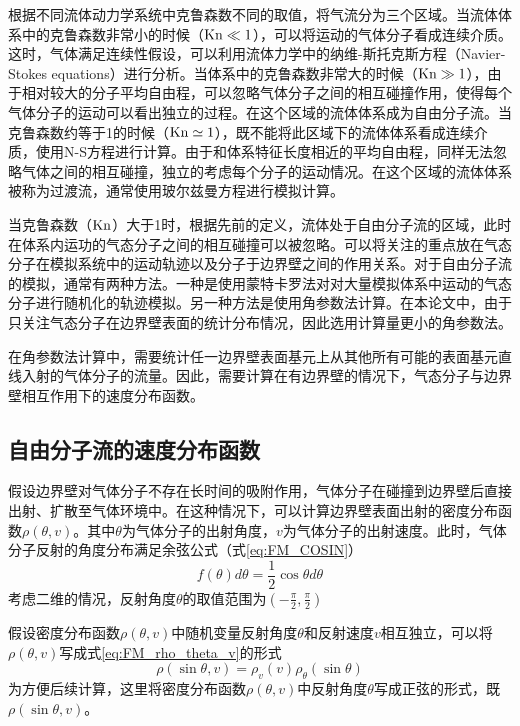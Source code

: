     根据不同流体动力学系统中克鲁森数不同的取值，将气流分为三个区域。当流体体系中的克鲁森数非常小的时候（${\rm Kn}\ll 1$），可以将运动的气体分子看成连续介质。这时，气体满足连续性假设，可以利用流体力学中的纳维-斯托克斯方程（Navier-Stokes equations）进行分析。当体系中的克鲁森数非常大的时候（${\rm Kn}\gg 1$），由于相对较大的分子平均自由程，可以忽略气体分子之间的相互碰撞作用，使得每个气体分子的运动可以看出独立的过程。在这个区域的流体体系成为自由分子流。当克鲁森数约等于1的时候（${\rm Kn}\simeq 1$），既不能将此区域下的流体体系看成连续介质，使用N-S方程进行计算。由于和体系特征长度相近的平均自由程，同样无法忽略气体之间的相互碰撞，独立的考虑每个分子的运动情况。在这个区域的流体体系被称为过渡流，通常使用玻尔兹曼方程进行模拟计算。

    当克鲁森数（${\rm Kn}$）大于1时，根据先前的定义，流体处于自由分子流的区域，此时在体系内运功的气态分子之间的相互碰撞可以被忽略。可以将关注的重点放在气态分子在模拟系统中的运动轨迹以及分子于边界壁之间的作用关系。对于自由分子流的模拟，通常有两种方法。一种是使用蒙特卡罗法对对大量模拟体系中运动的气态分子进行随机化的轨迹模拟。另一种方法是使用角参数法计算。在本论文中，由于只关注气态分子在边界壁表面的统计分布情况，因此选用计算量更小的角参数法。

    在角参数法计算中，需要统计任一边界壁表面基元上从其他所有可能的表面基元直线入射的气体分子的流量。因此，需要计算在有边界壁的情况下，气态分子与边界壁相互作用下的速度分布函数。
    
    \subsection{自由分子流的速度分布函数}
    假设边界壁对气体分子不存在长时间的吸附作用，气体分子在碰撞到边界壁后直接出射、扩散至气体环境中。在这种情况下，可以计算边界壁表面出射的密度分布函数$\rho\left(\theta, v\right)$。其中$\theta$为气体分子的出射角度，$v$为气体分子的出射速度。此时，气体分子反射的角度分布满足余弦公式（式\eqref{eq:FM_COSIN}）\chinesecolon
    \begin{equation}
        \label{eq:FM_COSIN}
        f\left(\theta\right)d\theta =\frac{1}{2}\cos\theta d\theta 
    \end{equation}    
    考虑二维的情况，反射角度$\theta$的取值范围为$\left(-\frac{\pi}{2},\frac{\pi}{2}\right)$

    假设密度分布函数$\rho\left(\theta, v\right)$中随机变量反射角度$\theta$和反射速度$v$相互独立，可以将$\rho\left(\theta, v\right)$写成式\eqref{eq:FM_rho_theta_v}的形式\chinesecolon
    \begin{equation}
        \label{eq:FM_rho_theta_v}
        \rho\left(\sin\theta,v\right)=\rho_v\left(v\right)\rho_\theta\left(\sin\theta\right)
    \end{equation}
    为方便后续计算，这里将密度分布函数$\rho\left(\theta, v\right)$中反射角度$\theta$写成正弦的形式，既$\rho(\sin\theta,v)$。

